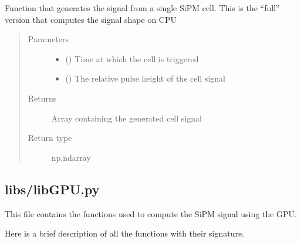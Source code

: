 \documentclass[letterpaper,10pt,english]{sphinxmanual}
\begin{document}

\begin{fulllineitems}
\label{\detokenize{structure:libs.libCPU.PulseCPU}}
Function that generates the signal from a single SiPM cell. This is the “full” version that computes the signal shape on CPU
\begin{quote}\begin{description}
\item[{Parameters}] \leavevmode\begin{itemize}
\item {} 
 () \textendash{} Time at which the cell is triggered

\item {} 
 () \textendash{} The relative pulse height of the cell signal

\end{itemize}

\item[{Returns}] \leavevmode
{} \textendash{} Array containing the generated cell signal

\item[{Return type}] \leavevmode
np.ndarray

\end{description}\end{quote}

\end{fulllineitems}



\subsection{libs/libGPU.py}
\label{\detokenize{structure:libs-libgpu-py}}
\begin{DUlineblock}{0em}
\item[] This file contains the functions used to compute the SiPM signal using the GPU.
\item[] Here is a brief description of all the functions with their signature.
\end{DUlineblock}
\end{document}
